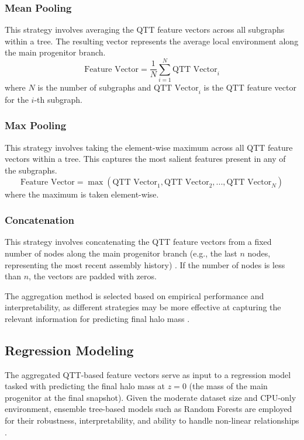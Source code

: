 \documentclass[twocolumn]{aastex631}
\begin{document}
\subsubsection{Mean Pooling}
This strategy involves averaging the QTT feature vectors across all subgraphs within a tree. The resulting vector represents the average local environment along the main progenitor branch.
\[
\text{Feature Vector} = \frac{1}{N} \sum_{i=1}^{N} \text{QTT Vector}_i
\]
where \(N\) is the number of subgraphs and \(\text{QTT Vector}_i\) is the QTT feature vector for the \(i\)-th subgraph.

\subsubsection{Max Pooling}
This strategy involves taking the element-wise maximum across all QTT feature vectors within a tree. This captures the most salient features present in any of the subgraphs.
\[
\text{Feature Vector} = \max(\text{QTT Vector}_1, \text{QTT Vector}_2, ..., \text{QTT Vector}_N)
\]
where the maximum is taken element-wise.

\subsubsection{Concatenation}
This strategy involves concatenating the QTT feature vectors from a fixed number of nodes along the main progenitor branch (e.g., the last \(n\) nodes, representing the most recent assembly history) \citep{ye2024quantizedtensornetworkssolving,ye2024quantizedtensornetworkssolving}. If the number of nodes is less than \(n\), the vectors are padded with zeros.

The aggregation method is selected based on empirical performance and interpretability, as different strategies may be more effective at capturing the relevant information for predicting final halo mass \citep{larson2024predictingdarkmatterhalo,cui2024knowhalomassfunction}.

\subsection{Regression Modeling}
The aggregated QTT-based feature vectors serve as input to a regression model tasked with predicting the final halo mass at \(z=0\) (the mass of the main progenitor at the final snapshot). Given the moderate dataset size and CPU-only environment, ensemble tree-based models such as Random Forests are employed for their robustness, interpretability, and ability to handle non-linear relationships \citep{larson2024predictingdarkmatterhalo}.
\end{document}
